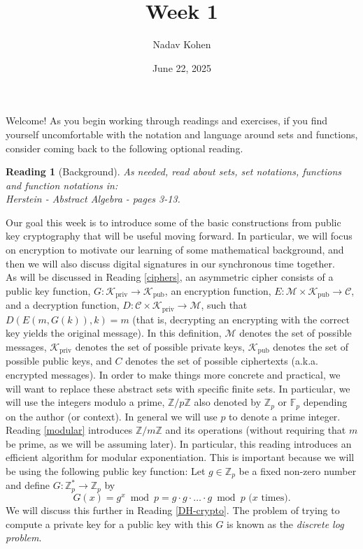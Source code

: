 \documentclass[12pt]{article}
\newcommand{\Z}[0]{\mathbb{Z}}
\newcommand{\F}[0]{\mathbb{F}}
\newcommand{\M}{\mathcal{M}}
\newcommand{\C}{\mathcal{C}}
\newcommand{\Kpriv}{\mathcal{K}_{\text{priv}}}
\newcommand{\Kpub}{\mathcal{K}_{\text{pub}}}
\newtheorem{reading}{Reading}
\theoremstyle{definition}
\theoremstyle{remark}
\theoremstyle{definition}
\begin{document}
\title{Week 1}
\author{Nadav Kohen}
\date{June 22, 2025}
\maketitle

Welcome! As you begin working through readings and exercises, if you find yourself uncomfortable with the notation and language around sets and functions, consider coming back to the following optional reading.

\begin{reading}[Background]\label{sets-background}
As needed, read about sets, set notations, functions and  function notations in:\\
Herstein - Abstract Algebra - pages 3-13.
\end{reading}

Our goal this week is to introduce some of the basic constructions from public key cryptography that will be useful moving forward. In particular, we will focus on encryption to motivate our learning of some mathematical background, and then we will also discuss digital signatures in our synchronous time together.\\

As will be discussed in Reading \ref{ciphers}, an asymmetric cipher consists of a public key function, $G: \Kpriv\to\Kpub$, an encryption function, $E: \M\times\Kpub\to\C$, and a decryption function, $D: \C\times\Kpriv\to\M$, such that $D(E(m, G(k)), k) = m$ (that is, decrypting an encrypting with the correct key yields the original message). In this definition, $\M$ denotes the set of possible messages, $\Kpriv$ denotes the set of possible private keys, $\Kpub$ denotes the set of possible public keys, and $C$ denotes the set of possible ciphertexts (a.k.a. encrypted messages). In order to make things more concrete and practical, we will want to replace these abstract sets with specific finite sets. In particular, we will use the integers modulo a prime, $\Z/p\Z$ also denoted by $\Z_p$ or $\F_p$ depending on the author (or context). In general we will use $p$ to denote a prime integer.\\

Reading \ref{modular} introduces $\Z/m\Z$ and its operations (without requiring that $m$ be prime, as we will be assuming later). In particular, this reading introduces an efficient algorithm for modular exponentiation. This is important because we will be using the following public key function: Let $g\in\Z_p$ be a fixed non-zero number and define $G: \Z_p^*\to\Z_p$ by
$$G(x) = g^x\bmod p = g\cdot g\cdot\ldots\cdot g\bmod p\text{ (}x\text{ times)}.$$ We will discuss this further in Reading \ref{DH-crypto}. The problem of trying to compute a private key for a public key with this $G$ is known as the \emph{discrete log problem}.
\end{document}
